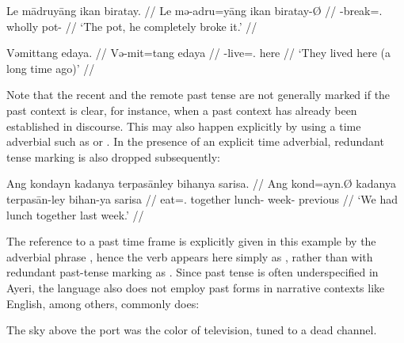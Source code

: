 \a\label{ex:pst}\begingl
	\gla Le mādruyāng ikan biratay. //
	\glb Le mə-adru=yāng ikan biratay-Ø //
	\glc \PatTI{} \Pst{}-break=\TsgM{}.\Aarg{} wholly pot-\Top{} //
	\glft `The pot, he completely broke it.' //
\endgl

\a\label{ex:rpst}\begingl
	\gla Vəmittang edaya. //
	\glb Və-mit=tang edaya //
	\glc \RPst{}-live=\TplM{}.\Aarg{} here //
	\glft `They lived here (a long time ago)' //
\endgl

\xe

Note that the recent and the remote past tense are not generally marked if the 
past context is clear, for instance, when a past context has already been 
established in discourse. This may also happen explicitly by using a time 
adverbial such as  or . In the presence of an 
explicit time adverbial, redundant tense marking is also dropped subsequently:

\ex\begingl
	\gla Ang kondayn kadanya terpasānley bihanya sarisa. //
	\glb Ang kond=ayn.Ø kadanya terpasān-ley bihan-ya sarisa //
	\glc \AgtT{} eat=\Fpl{}.\Top{} together lunch-\PargI{} week-\Loc{}
		previous //
	\glft `We had lunch together last week.' //
\endgl\xe

The reference to a past time frame is explicitly given in this example by the
adverbial phrase , hence the verb
appears here simply as , rather than with redundant
past-tense marking as . Since past tense is often
underspecified in Ayeri, the language also does not employ past forms in
narrative contexts like English, among others, commonly does:

\ex\label{ex:neuromancer}
	The sky above the port was the color of television, tuned to a dead 
	channel. 
\xe


